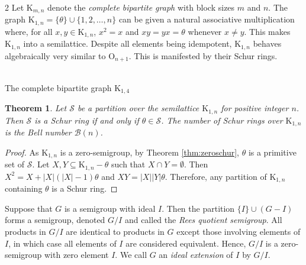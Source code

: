 \documentclass{article}
\theoremstyle{plain}
\newtheorem{Thm}{Theorem}[section]
\theoremstyle{definition}
\newcommand{\thmref}[1]{Theorem \ref{#1}}
\renewcommand{\S}{\mathcal{S}}
\newcommand{\B}{\mathscr{B}}
\renewcommand{\O}{\mathrm{O}}
\newcommand{\K}{\mathrm{K}}
\begin{document}
\begin{multicols}{2}
Let $\K_{m,n}$ denote the \emph{complete bipartite graph} with block sizes $m$ and $n$. The graph $\K_{1,n} = \{\theta\} \cup \{1,2, \ldots, n\}$ can be given a natural associative multiplication where, for all $x,y\in \K_{1,n}$, $x^2=x$ and $xy=yx=\theta$ whenever $x\neq y$. This makes \label{bipart}$\K_{1,n}$ into a semilattice. Despite all elements being idempotent, $\K_{1,n}$ behaves algebraically very similar to $\O_{n+1}$. This is manifested by their Schur rings. \columnbreak

\begin{center}
\\[0.5cm]
The complete bipartite graph $\K_{1,4}$
\end{center}
\end{multicols}

\begin{Thm}\label{thm:bipartiteschur}
Let $\S$ be a partition over the semilattice $\K_{1,n}$ for positive integer $n$. Then $\S$ is a Schur ring if and only if $\theta\in \S$. The number of Schur rings over $\K_{1,n}$ is the Bell number $\B(n)$.
\end{Thm}
\begin{proof}
    As $\K_{1,n}$ is a zero-semigroup, by \thmref{thm:zeroschur}, $\theta$ is a primitive set of $\S$. Let $X,Y\subseteq \K_{1,n} - \theta$ such that $X\cap Y=\emptyset$. Then $X^2 = X + |X|(|X|-1)\theta$ and $XY = |X||Y|\theta$. Therefore, any partition of $\K_{1,n}$ containing $\theta$ is a Schur ring. 
\end{proof}

Suppose that $G$ is a semigroup with ideal $I$. Then the partition $\{I\} \cup (G-I)$ forms a semigroup, denoted $G/I$ and called the \emph{Rees quotient semigroup}. All products in $G/I$ are identical to products in $G$ except those involving elements of $I$, in which case all elements of $I$ are considered equivalent. Hence, $G/I$ is a zero-semigroup with zero element $I$. We call $G$ an \emph{ideal extension} of $I$ by $G/I$. 
\end{document}
